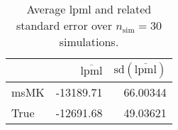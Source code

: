 \begin{table}[H]

\caption{Average lpml and related standard error over $n_{\text{sim}} = 30$ simulations.}
\centering
\begin{tabular}[t]{lrr}
\toprule
  & $\overbar{\text{lpml}}$ & $\text{sd}(\overbar{\text{lpml}})$\\
\midrule
msMK & -13189.71 & 66.00344\\
True & -12691.68 & 49.03621\\
\bottomrule
\end{tabular}
\end{table}